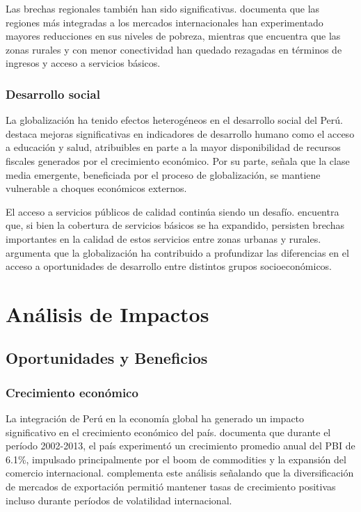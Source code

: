 \documentclass[12pt, a4paper]{article}
\begin{document}
Las brechas regionales también han sido significativas. \textcite{escobal2018geografia} documenta que las regiones más integradas a los mercados internacionales han experimentado mayores reducciones en sus niveles de pobreza, mientras que \textcite{barrantes2019disparidades} encuentra que las zonas rurales y con menor conectividad han quedado rezagadas en términos de ingresos y acceso a servicios básicos.

\subsubsection{Desarrollo social}
La globalización ha tenido efectos heterogéneos en el desarrollo social del Perú. \textcite{vasquez2020inclusion} destaca mejoras significativas en indicadores de desarrollo humano como el acceso a educación y salud, atribuibles en parte a la mayor disponibilidad de recursos fiscales generados por el crecimiento económico. Por su parte, \textcite{franco2019vulnerabilidad} señala que la clase media emergente, beneficiada por el proceso de globalización, se mantiene vulnerable a choques económicos externos.

El acceso a servicios públicos de calidad continúa siendo un desafío. \textcite{sanchez2021servicios} encuentra que, si bien la cobertura de servicios básicos se ha expandido, persisten brechas importantes en la calidad de estos servicios entre zonas urbanas y rurales. \textcite{aramburú2019cohesion} argumenta que la globalización ha contribuido a profundizar las diferencias en el acceso a oportunidades de desarrollo entre distintos grupos socioeconómicos.

\section{Análisis de Impactos}

\subsection{Oportunidades y Beneficios}

\subsubsection{Crecimiento económico}
La integración de Perú en la economía global ha generado un impacto significativo en el crecimiento económico del país. \textcite{dancourt2018boom} documenta que durante el período 2002-2013, el país experimentó un crecimiento promedio anual del PBI de 6.1\%, impulsado principalmente por el boom de commodities y la expansión del comercio internacional. \textcite{castillo2020exportaciones} complementa este análisis señalando que la diversificación de mercados de exportación permitió mantener tasas de crecimiento positivas incluso durante períodos de volatilidad internacional.
\end{document}
